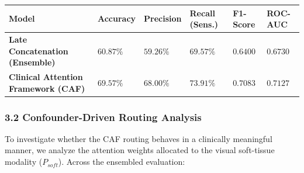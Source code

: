 \documentclass[
]{article}
\newcounter{none} %
\begin{document}
{\def\LTcaptype{none} %
\begin{longtable}[]{@{}
  >{\raggedright\arraybackslash}p{}
  >{\centering\arraybackslash}p{}
  >{\centering\arraybackslash}p{}
  >{\centering\arraybackslash}p{}
  >{\centering\arraybackslash}p{}
  >{\centering\arraybackslash}p{}@{}}
\toprule\noalign{}
\begin{minipage}[b]{\linewidth}\raggedright
Model
\end{minipage} & \begin{minipage}[b]{\linewidth}\centering
Accuracy
\end{minipage} & \begin{minipage}[b]{\linewidth}\centering
Precision
\end{minipage} & \begin{minipage}[b]{\linewidth}\centering
Recall (Sens.)
\end{minipage} & \begin{minipage}[b]{\linewidth}\centering
F1-Score
\end{minipage} & \begin{minipage}[b]{\linewidth}\centering
ROC-AUC
\end{minipage} \\
\midrule\noalign{}
\endhead
\bottomrule\noalign{}
\endlastfoot
\textbf{Late Concatenation (Ensemble)} & \(60.87\%\) & \(59.26\%\) &
\(69.57\%\) & \(0.6400\) & \(0.6730\) \\
\textbf{Clinical Attention Framework (CAF)} & \textbf{\(69.57\%\)} &
\textbf{\(68.00\%\)} & \textbf{\(73.91\%\)} & \textbf{\(0.7083\)} &
\textbf{\(0.7127\)} \\
\end{longtable}
}

\subsubsection{\texorpdfstring{\textbf{3.2 Confounder-Driven Routing
Analysis}}{3.2 Confounder-Driven Routing Analysis}}\label{confounder-driven-routing-analysis}

To investigate whether the CAF routing behaves in a clinically
meaningful manner, we analyze the attention weights allocated to the
visual soft-tissue modality (\(P_{soft}\)). Across the ensembled
evaluation:
\end{document}
